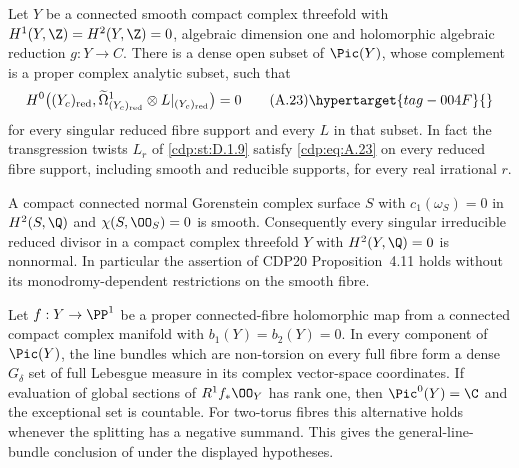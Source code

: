 \begin{proposition}\hypertarget{tag-01AY}{}\label{cdp:st:A.4.9}

Let $Y$ be a connected smooth compact complex threefold with $H^1(Y,\Z)=H^2(Y,\Z)=0$, algebraic dimension one and holomorphic algebraic reduction $g:Y\to C$. There is a dense open subset of $\Pic(Y)$, whose complement is a proper complex analytic subset, such that
\[
 H^0\bigl((Y_c)_{\rm red},
       \widetilde\Omega^1_{(Y_c)_{\rm red}}\otimes L|_{(Y_c)_{\rm red}}\bigr)=0
 \tag{A.23}\hypertarget{tag-004F}{}\label{cdp:eq:A.23}
\]
for every singular reduced fibre support and every $L$ in that subset. In fact the transgression twists $L_r$ of \ref{cdp:st:D.1.9} satisfy \eqref{cdp:eq:A.23} on every reduced fibre support, including smooth and reducible supports, for every real irrational $r$.
\end{proposition}

\begin{proposition}\hypertarget{tag-01BA}{}\label{cdp:st:A.5.2}

A compact connected normal Gorenstein complex surface $S$ with $c_1(\omega_S)=0$ in $H^2(S,\Q)$ and $\chi(S,\OO_S)=0$ is smooth. Consequently every singular irreducible reduced divisor in a compact complex threefold $Y$ with $H^2(Y,\Q)=0$ is nonnormal. In particular the assertion of CDP20 Proposition~4.11 holds without its monodromy-dependent restrictions on the smooth fibre.
\end{proposition}

\begin{proposition}\hypertarget{tag-01FW}{}\label{cdp:st:D.1.11}

Let $f:Y\to\PP^1$ be a proper connected-fibre holomorphic map from
a connected compact complex manifold with $b_1(Y)=b_2(Y)=0$.
In every component of $\Pic(Y)$, the line
bundles which are non-torsion on every full fibre form a dense
$G_\delta$ set of full Lebesgue measure in its complex vector-space
coordinates. If evaluation of global sections of $R^1f_*\OO_Y$
has rank one, then $\Pic^0(Y)=\C$ and the exceptional set is
countable. For two-torus fibres this alternative holds whenever
the splitting has a negative summand.
This gives the general-line-bundle conclusion of
\citet[Proposition~5.6]{CDP2020} under the displayed hypotheses.
\end{proposition}
